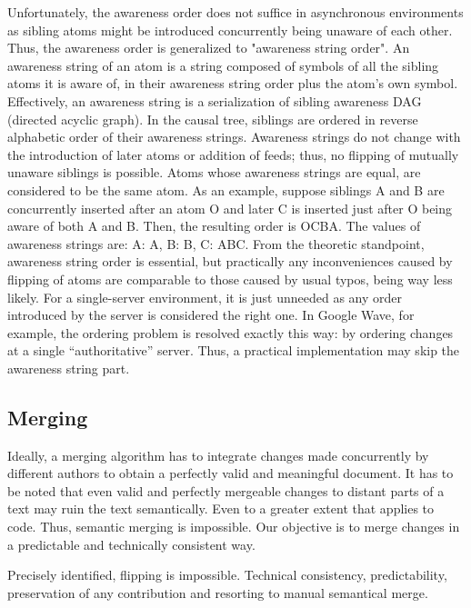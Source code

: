 \documentclass{acm_proc_article-sp}
\begin{document}
   Unfortunately, the awareness order does not suffice in asynchronous
   environments as sibling atoms might be introduced concurrently
   being unaware of each other. Thus, the awareness order is
   generalized to "awareness string order". An awareness string of an
   atom is a string composed of symbols of all the sibling atoms it is
   aware of, in their awareness string order plus the atom's own symbol.
   Effectively, an awareness string is a serialization of sibling
   awareness DAG (directed acyclic graph). In the causal tree,
   siblings are ordered in reverse alphabetic order of their awareness
   strings. Awareness strings do not change with the introduction of
   later atoms or addition of feeds; thus, no flipping of mutually
   unaware siblings is possible. Atoms whose awareness strings are
   equal, are considered to be the same atom.
   As an example, suppose siblings A and B are concurrently inserted
   after an atom O and later C is inserted just after O being aware of
   both A and B. Then, the resulting order is OCBA. The values of
   awareness strings are:
     A:    A,
     B:    B,
     C:    ABC.
   From the theoretic standpoint, awareness string order is essential,
   but practically any inconveniences caused by flipping of atoms are
   comparable to those caused by usual typos, being way less likely.
   For a single-server environment, it is just unneeded as any order
   introduced by the server is considered the right one. In
   Google Wave, for example, the ordering problem is resolved exactly
   this way: by ordering changes at a single ``authoritative'' server.
   Thus, a practical implementation may skip the awareness string part.
   
\subsection {Merging}
  Ideally, a merging algorithm has to integrate changes made concurrently
  by different authors to obtain a perfectly valid and meaningful
  document.
  It has to be noted that even valid and perfectly mergeable changes to
  distant parts of a text may ruin the text semantically. Even to a 
  greater extent that applies to code. Thus, semantic merging is
  impossible. Our objective is to merge changes in a predictable and
  technically consistent way.
  
  Precisely identified, flipping is impossible.
  Technical consistency, predictability,
   preservation of any contribution and resorting
  to manual semantical merge.
  
\end{document}
